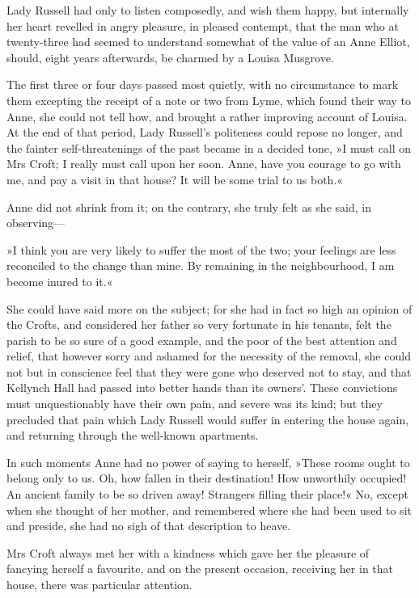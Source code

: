 Lady Russell had only to listen composedly, and wish them happy, but internally her heart revelled in angry pleasure, in pleased contempt, that the man who at twenty-three had seemed to understand somewhat of the value of an Anne Elliot, should, eight years afterwards, be charmed by a Louisa Musgrove.

The first three or four days passed most quietly, with no circumstance to mark them excepting the receipt of a note or two from Lyme, which found their way to Anne, she could not tell how, and brought a rather improving account of Louisa. At the end of that period, Lady Russell's politeness could repose no longer, and the fainter self-threatenings of the past became in a decided tone, »I must call on Mrs Croft; I really must call upon her soon. Anne, have you courage to go with me, and pay a visit in that house? It will be some trial to us both.«

Anne did not shrink from it; on the contrary, she truly felt as she said, in observing—

»I think you are very likely to suffer the most of the two; your feelings are less reconciled to the change than mine. By remaining in the neighbourhood, I am become inured to it.«

She could have said more on the subject; for she had in fact so high an opinion of the Crofts, and considered her father so very fortunate in his tenants, felt the parish to be so sure of a good example, and the poor of the best attention and relief, that however sorry and ashamed for the necessity of the removal, she could not but in conscience feel that they were gone who deserved not to stay, and that Kellynch Hall had passed into better hands than its owners'. These convictions must unquestionably have their own pain, and severe was its kind; but they precluded that pain which Lady Russell would suffer in entering the house again, and returning through the well-known apartments.

In such moments Anne had no power of saying to herself, »These rooms ought to belong only to us. Oh, how fallen in their destination! How unworthily occupied! An ancient family to be so driven away! Strangers filling their place!« No, except when she thought of her mother, and remembered where she had been used to sit and preside, she had no sigh of that description to heave.

Mrs Croft always met her with a kindness which gave her the pleasure of fancying herself a favourite, and on the present occasion, receiving her in that house, there was particular attention.

